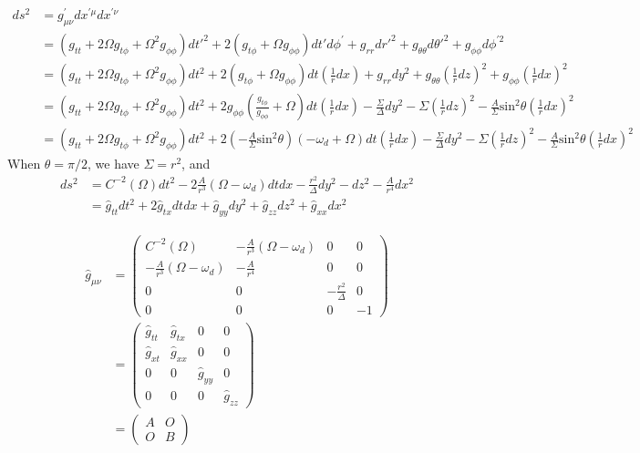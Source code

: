 \documentclass[english]{article}
\begin{document}
\begin{align*}
ds^{2} & =g^{'}_{\mu\nu}dx^{'\mu}dx^{'\nu}\\
 & =\left(g_{tt}+2\Omega g_{t\phi}+\Omega^{2}g_{\phi\phi}\right)dt'^{2}+2\left(g_{t\phi}+\Omega g_{\phi\phi}\right)dt'd\phi^{'}+g_{rr}dr'^{2}+g_{\theta\theta}d\theta'^{2}+g_{\phi\phi}d\phi^{'2}\\
 & =\left(g_{tt}+2\Omega g_{t\phi}+\Omega^{2}g_{\phi\phi}\right)dt^{2}+2\left(g_{t\phi}+\Omega g_{\phi\phi}\right)dt\left(\frac{1}{r}dx\right)+g_{rr}dy^{2}+g_{\theta\theta}\left(\frac{1}{r}dz\right)^{2}+g_{\phi\phi}\left(\frac{1}{r}dx\right)^{2}\\
 & =\left(g_{tt}+2\Omega g_{t\phi}+\Omega^{2}g_{\phi\phi}\right)dt^{2}+2g_{\phi\phi}\left(\frac{g_{t\phi}}{g_{\phi\phi}}+\Omega\right)dt\left(\frac{1}{r}dx\right)-\frac{\Sigma}{\Delta}dy^{2}-\Sigma\left(\frac{1}{r}dz\right)^{2}-\frac{A}{\Sigma}\text{sin}^{2}\theta\left(\frac{1}{r}dx\right)^{2}\\
 & =\left(g_{tt}+2\Omega g_{t\phi}+\Omega^{2}g_{\phi\phi}\right)dt^{2}+2\left(-\frac{A}{\Sigma}\text{sin}^{2}\theta\right)\left(-\omega_{d}+\Omega\right)dt\left(\frac{1}{r}dx\right)-\frac{\Sigma}{\Delta}dy^{2}-\Sigma\left(\frac{1}{r}dz\right)^{2}-\frac{A}{\Sigma}\text{sin}^{2}\theta\left(\frac{1}{r}dx\right)^{2}
\end{align*}
 When $\theta=\pi/2$, we have $\Sigma=r^{2}$, and 
\begin{align*}
ds^{2} & =C^{-2}\left(\Omega\right)dt^{2}-2\frac{A}{r^{3}}\left(\Omega-\omega_{d}\right)dtdx-\frac{r^{2}}{\Delta}dy^{2}-dz^{2}-\frac{A}{r^{4}}dx^{2}\\
 & =\hat{g}_{tt}dt^{2}+2\hat{g}_{tx}dtdx+\hat{g}_{yy}dy^{2}+\hat{g}_{zz}dz^{2}+\hat{g}_{xx}dx^{2}
\end{align*}

\begin{align*}
\hat{g}_{\mu\nu} & =\begin{pmatrix}C^{-2}\left(\Omega\right) & -\frac{A}{r^{3}}\left(\Omega-\omega_{d}\right) & 0 & 0\\
-\frac{A}{r^{3}}\left(\Omega-\omega_{d}\right) & -\frac{A}{r^{4}} & 0 & 0\\
0 & 0 & -\frac{r^{2}}{\Delta} & 0\\
0 & 0 & 0 & -1
\end{pmatrix}\\
 & =\begin{pmatrix}\hat{g}_{tt} & \hat{g}_{tx} & 0 & 0\\
\hat{g}_{xt} & \hat{g}_{xx} & 0 & 0\\
0 & 0 & \hat{g}_{yy} & 0\\
0 & 0 & 0 & \hat{g}_{zz}
\end{pmatrix}\\
 & =\begin{pmatrix}A & O\\
O & B
\end{pmatrix}
\end{align*}
\end{document}
